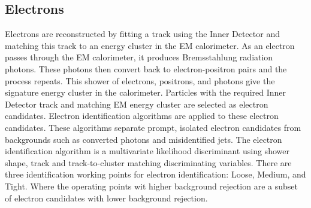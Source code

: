 \subsection{Electrons}
Electrons are reconstructed by fitting a track using the Inner Detector and matching this track to an energy cluster in the EM calorimeter\cite{Tarna:2286383}. As an electron passes through the EM calorimeter, it produces Bremsstahlung radiation photons. These photons then convert back to electron-positron pairs and the process repeats. This shower of electrons, positrons, and photons give the signature energy cluster in the calorimeter. Particles with the required Inner Detector track and matching EM energy cluster are selected as electron candidates.\newline
\indent Electron identification algorithms are applied to these electron candidates. These algorithms separate prompt, isolated electron candidates from backgrounds such as converted photons and misidentified jets. The electron identification algorithm is a multivariate likelihood discriminant using shower shape, track and track-to-cluster matching discriminating variables. There are three identification working points for electron identification: Loose, Medium, and Tight. Where the operating points wit higher background rejection are a subset of electron candidates with lower background rejection.\newline
